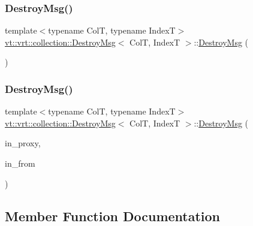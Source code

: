 \subsubsection{\texorpdfstring{Destroy\+Msg()}{DestroyMsg()}\hspace{0.1cm}{\footnotesize\ttfamily [1/2]}}
{\footnotesize\ttfamily template$<$typename ColT, typename IndexT$>$ \\
\hyperlink{structvt_1_1vrt_1_1collection_1_1_destroy_msg}{vt\+::vrt\+::collection\+::\+Destroy\+Msg}$<$ ColT, IndexT $>$\+::\hyperlink{structvt_1_1vrt_1_1collection_1_1_destroy_msg}{Destroy\+Msg} (\begin{DoxyParamCaption}{ }\end{DoxyParamCaption})\hspace{0.3cm}{\ttfamily [default]}}

\mbox{\label{structvt_1_1vrt_1_1collection_1_1_destroy_msg_a7a4d9c50086362cd44933fc4c2b6f53d}} 
\subsubsection{\texorpdfstring{Destroy\+Msg()}{DestroyMsg()}\hspace{0.1cm}{\footnotesize\ttfamily [2/2]}}
{\footnotesize\ttfamily template$<$typename ColT, typename IndexT$>$ \\
\hyperlink{structvt_1_1vrt_1_1collection_1_1_destroy_msg}{vt\+::vrt\+::collection\+::\+Destroy\+Msg}$<$ ColT, IndexT $>$\+::\hyperlink{structvt_1_1vrt_1_1collection_1_1_destroy_msg}{Destroy\+Msg} (\begin{DoxyParamCaption}\item[{\hyperlink{structvt_1_1vrt_1_1collection_1_1_destroy_msg_a5bf089cacadf94e55e9ae797c4cd0462}{Collection\+Proxy\+Type} const \&}]{in\+\_\+proxy,  }\item[{\hyperlink{namespacevt_a866da9d0efc19c0a1ce79e9e492f47e2}{Node\+Type} const \&}]{in\+\_\+from }\end{DoxyParamCaption})\hspace{0.3cm}{\ttfamily [inline]}}



\subsection{Member Function Documentation}
\mbox{\label{structvt_1_1vrt_1_1collection_1_1_destroy_msg_a598fc97dc1277e545b741e1272da588c}} 
